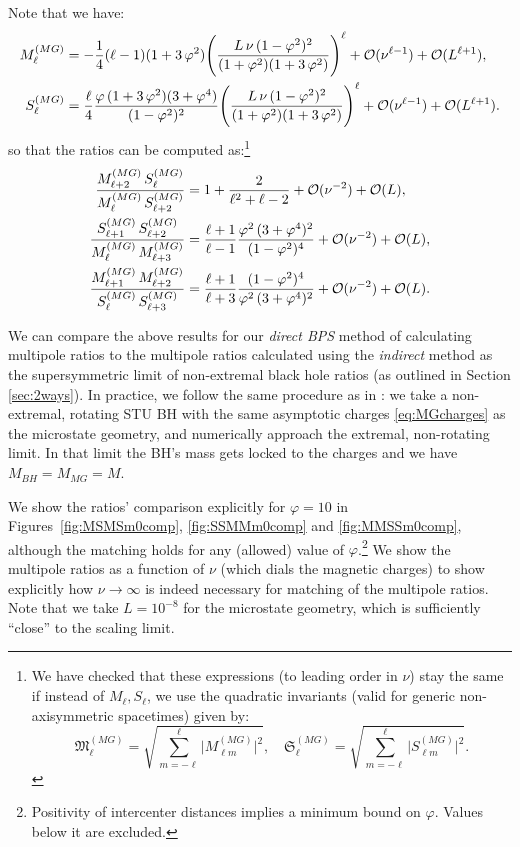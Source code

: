 \documentclass[12pt,a4paper]{article}
\def\indirect{\emph{indirect} }
\def\direct{\emph{direct BPS} }
\begin{document}
Note that we have:
\begin{align}
M_\ell^{(MG)}&=-\frac{1}{4}(\ell-1)(1+3\,\varphi^2)\Bigg(\frac{L\,\nu\,(1-\varphi^2)^2}{(1+\varphi^2)(1+3\,\varphi^2)}\Bigg)^\ell+\mathcal{O}(\nu^{\ell-1})+\mathcal{O}(L^{\ell+1}),\notag\\
S_\ell^{(MG)}&=\frac{\ell}{4}\frac{\varphi\,(1+3\,\varphi^2)(3+\varphi^4)}{(1-\varphi^2)^2}\Bigg(\frac{L\,\nu\,(1-\varphi^2)^2}{(1+\varphi^2)(1+3\,\varphi^2)}\Bigg)^\ell+\mathcal{O}(\nu^{\ell-1})+\mathcal{O}(L^{\ell+1}).
\end{align}
so that the ratios can be computed as:\footnote{We have checked that these expressions (to leading order in $\nu$) stay the same if instead of $M_\ell,S_\ell$, we use the quadratic invariants (valid for generic non-axisymmetric spacetimes) given by:
\begin{equation}
\mathfrak{M}^{(MG)}_{\ell}=\sqrt{\sum_{m=-\ell}^{\ell}\lvert M^{(MG)}_{\ell m}\rvert^2},\quad \mathfrak{S}^{(MG)}_{\ell}=\sqrt{\sum_{m=-\ell}^{\ell}\lvert S^{(MG)}_{\ell m}\rvert^2}.
\end{equation}
}
\begin{align}\label{eq:m0Ratios}
\frac{M^{(MG)}_{\ell+2}\,S^{(MG)}_{\ell}}{M^{(MG)}_\ell\,S^{(MG)}_{\ell+2}}&=1+\frac{2}{\ell^2+\ell-2}+\mathcal{O}(\nu^{-2})+\mathcal{O}(L),\notag\\
\frac{S^{(MG)}_{\ell+1}\,S^{(MG)}_{\ell+2}}{M^{(MG)}_\ell\,M^{(MG)}_{\ell+3}}&=\frac{\ell+1}{\ell-1}\frac{\varphi^2\,(3+\varphi^4)^2}{(1-\varphi^2)^4}+\mathcal{O}(\nu^{-2})+\mathcal{O}(L),\notag\\
\frac{M^{(MG)}_{\ell+1}\,M^{(MG)}_{\ell+2}}{S^{(MG)}_\ell\,S^{(MG)}_{\ell+3}}&=\frac{\ell+1}{\ell+3}\frac{(1-\varphi^2)^4}{\varphi^2\,(3+\varphi^4)^2}+\mathcal{O}(\nu^{-2})+\mathcal{O}(L).
\end{align}

We can compare the above results for our \direct method of calculating multipole ratios to the multipole ratios calculated using the \indirect method as the supersymmetric limit of non-extremal black hole ratios (as outlined in Section \ref{sec:2ways}). In practice, we follow the same procedure as in \cite{Bena:2020uup,Bena:2020see}: we take a non-extremal, rotating STU BH with the same asymptotic charges \eqref{eq:MGcharges} as the microstate geometry, and numerically approach the extremal, non-rotating limit. In that limit the BH's mass gets locked to the charges and we have $M_{BH}=M_{MG}=M$.

We show the ratios' comparison explicitly for $\varphi=10$ in Figures~\ref{fig:MSMSm0comp}, \ref{fig:SSMMm0comp} and \ref{fig:MMSSm0comp}, although the matching holds for any (allowed) value of $\varphi$.\footnote{Positivity of intercenter distances implies a minimum bound on $\varphi$. Values below it are excluded.} We show the multipole ratios as a function of $\nu$ (which dials the magnetic charges) to show explicitly how $\nu\rightarrow\infty$ is indeed necessary for matching of the multipole ratios. Note that we take $L=10^{-8}$ for the microstate geometry, which is sufficiently ``close'' to the scaling limit. 
\end{document}
